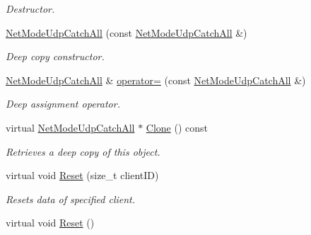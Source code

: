 \begin{DoxyCompactItemize}
\begin{DoxyCompactList}\small\item\em Destructor. \item\end{DoxyCompactList}\item 
\hyperlink{class_net_mode_udp_catch_all_af57dcd2731c4695473b1e492db61f3d2}{NetModeUdpCatchAll} (const \hyperlink{class_net_mode_udp_catch_all}{NetModeUdpCatchAll} \&)
\begin{DoxyCompactList}\small\item\em Deep copy constructor. \item\end{DoxyCompactList}\item 
\hyperlink{class_net_mode_udp_catch_all}{NetModeUdpCatchAll} \& \hyperlink{class_net_mode_udp_catch_all_ae6f49327f5ee096131088bd57ae243eb}{operator=} (const \hyperlink{class_net_mode_udp_catch_all}{NetModeUdpCatchAll} \&)
\begin{DoxyCompactList}\small\item\em Deep assignment operator. \item\end{DoxyCompactList}\item 
virtual \hyperlink{class_net_mode_udp_catch_all}{NetModeUdpCatchAll} $\ast$ \hyperlink{class_net_mode_udp_catch_all_a6ab3fa975dd909cc49ce378436343d8b}{Clone} () const 
\begin{DoxyCompactList}\small\item\em Retrieves a deep copy of this object. \item\end{DoxyCompactList}\item 
virtual void \hyperlink{class_net_mode_udp_catch_all_a00d7aca63598b6e3c270fd157627885f}{Reset} (size\_\-t clientID)
\begin{DoxyCompactList}\small\item\em Resets data of specified client. \item\end{DoxyCompactList}\item 
\hypertarget{class_net_mode_udp_catch_all_a0a727c03f13ab2372a7be9477e6fb6e9}{
virtual void \hyperlink{class_net_mode_udp_catch_all_a0a727c03f13ab2372a7be9477e6fb6e9}{Reset} ()}
\label{class_net_mode_udp_catch_all_a0a727c03f13ab2372a7be9477e6fb6e9}


\end{DoxyCompactItemize}
